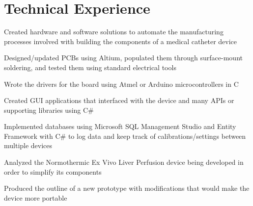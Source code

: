 \documentclass[]{aftab-resume}
\begin{document}
\begin{minipage}[t]{0.66\textwidth} 


\section{Technical Experience}
\vspace{0.15cm}


\vspace{\topsep} %
\begin{tightemize}
\item Created hardware and software solutions to automate the manufacturing processes involved with building the components of a medical catheter device
\item Designed/updated PCBs using Altium, populated them through surface-mount soldering, and tested them using standard electrical tools
\item Wrote the drivers for the board using Atmel or Arduino microcontrollers in C
\item Created GUI applications that interfaced with the device and many APIs or supporting libraries using C\#
\item Implemented databases using Microsoft SQL Management Studio and Entity Framework with C\# to log data and keep track of calibrations/settings between multiple devices
\end{tightemize}

\sectionsep


\begin{tightemize}
\item Analyzed the Normothermic Ex Vivo Liver Perfusion device being developed in order to simplify its components
\item Produced the outline of a new prototype with modifications that would make the device more portable
\end{tightemize}

\vspace{0.9cm}


\end{minipage}
\end{document}
